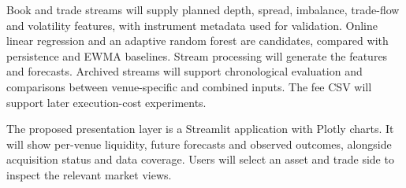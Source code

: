 \documentclass[11pt,a4paper]{article}
\begin{document}
Book and trade streams will supply planned depth, spread, imbalance, trade-flow and volatility features, with instrument metadata used for validation. Online linear regression and an adaptive random forest are candidates, compared with persistence and EWMA baselines. Stream processing will generate the features and forecasts. Archived streams will support chronological evaluation and comparisons between venue-specific and combined inputs. The fee CSV will support later execution-cost experiments.

The proposed presentation layer is a Streamlit application with Plotly charts. It will show per-venue liquidity, future forecasts and observed outcomes, alongside acquisition status and data coverage. Users will select an asset and trade side to inspect the relevant market views.
\end{document}
